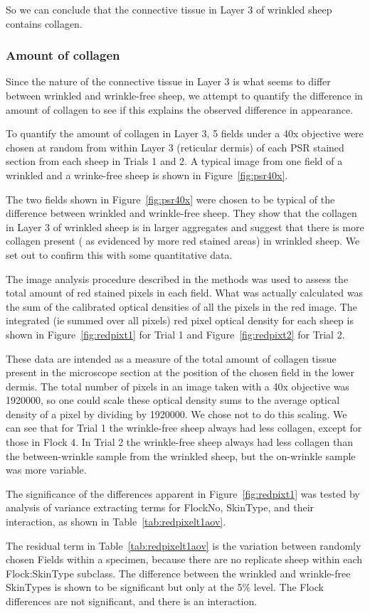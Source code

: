 \documentclass[titlepage]{article}  %
\begin{document}
So we can conclude that the  connective tissue in Layer 3 of wrinkled sheep contains collagen. 

\subsubsection{Amount of collagen}
Since the nature of the connective tissue in Layer 3 is what seems to differ between wrinkled and wrinkle-free sheep, we attempt to quantify the difference in amount of collagen to see if this explains the observed difference in appearance.

To quantify the amount of collagen in Layer 3, 5 fields under a 40x objective were chosen at random from within Layer 3 (reticular dermis) of each PSR stained section from each sheep in Trials 1 and 2. A typical image from one field of a wrinkled and a wrinke-free sheep is shown in Figure~\ref{fig:psr40x}.

The two fields shown in Figure~\ref{fig:psr40x} were chosen to be typical of the difference between wrinkled and wrinkle-free sheep. They show that the collagen in Layer 3 of wrinkled sheep is in larger aggregates and suggest that there is more collagen present ( as evidenced by more red stained areas) in wrinkled sheep. We set out to confirm this with some quantitative data.

 The image analysis procedure described in the methods was used to assess the total amount of red stained pixels in each field.  What was actually calculated was the sum of the calibrated optical densities of all the pixels in the red image. The integrated (ie summed over all pixels) red pixel optical density for each sheep is shown  in Figure~\ref{fig:redpixt1} for Trial 1 and Figure~\ref{fig:redpixt2} for Trial 2.


These data are intended as a measure of the total amount of collagen tissue present in the microscope section at the position of the chosen field in the lower dermis.
The total number of pixels in an image taken with a 40x objective was 1920000, so one could scale these optical density sums to the average optical density of a pixel by dividing by 1920000. We chose not to do this scaling.
We can see that for Trial 1 the wrinkle-free sheep always had less collagen, except for those in Flock 4. In Trial 2  the wrinkle-free sheep always had less collagen than the between-wrinkle sample from the wrinkled sheep, but the on-wrinkle sample was more variable.

The significance of the differences apparent in Figure~\ref{fig:redpixt1} was tested by analysis of variance extracting terms for FlockNo, SkinType, and their interaction, as shown in Table~\ref{tab:redpixelt1aov}.

The residual term in Table~\ref{tab:redpixelt1aov} is the variation between randomly chosen Fields within a specimen, because there are no replicate sheep within each Flock:SkinType subclass. The difference between the wrinkled and wrinkle-free SkinTypes is shown to be significant but only at the 5\% level. The Flock differences are not significant, and there is an interaction.
\end{document}
